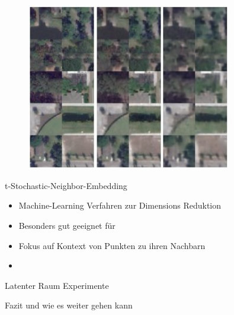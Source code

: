 \begin{frame}
	\begin{figure}
		\includegraphics[width=0.8\textwidth]{images/figures/presentation/good_reconstructions.jpg}
	\end{figure}
\end{frame}







\begin{frame}{t-Stochastic-Neighbor-Embedding}
	\begin{itemize}
		\item Machine-Learning Verfahren zur Dimensions Reduktion
		\item Besonders gut geeignet für 
		\item Fokus auf Kontext von Punkten zu ihren Nachbarn
		\item 
	\end{itemize}
\end{frame}

	
\begin{frame}{Latenter Raum Experimente}
\end{frame}


\begin{frame}{Fazit und wie es weiter gehen kann}
\end{frame}